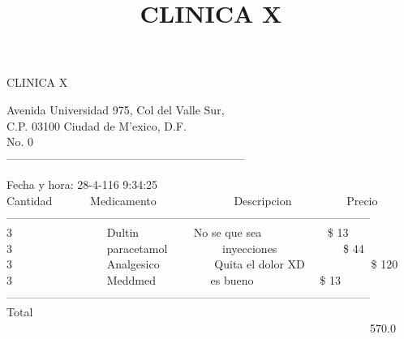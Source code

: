 \documentclass[10pt,a4paper]{letter}
\title{\bf CLINICA X}
\begin{document}
\begin{center}
{\scshape\LARGE CLINICA X\par}
{Avenida Universidad 975, Col del Valle Sur,\\}
{C.P. 03100 Ciudad de M'exico, D.F.}\\ 
{No. 0}\\ 
---------------------------------------------------------------
\end{center}

Fecha y hora: 28-4-116 9:34:25\\

Cantidad \ \ \ \ \ \ Medicamento \ \ \ \ \ \ \ \ \ \ \ \ \  Descripcion  \ \ \ \ \ \ \ \ \ Precio \\
------------------------------------------------------------------------------------------------ \\
3 \ \ \ \ \ \ \ \ \ \ \ \ \ \ \ \ Dultin \ \ \ \ \ \ \ \ \ No se que sea \ \ \ \ \ \ \ \ \ \ \ \$ 13 \\
3 \ \ \ \ \ \ \ \ \ \ \ \ \ \ \ \ paracetamol \ \ \ \ \ \ \ \ \ inyecciones \ \ \ \ \ \ \ \ \ \ \ \$ 44 \\
3 \ \ \ \ \ \ \ \ \ \ \ \ \ \ \ \ Analgesico \ \ \ \ \ \ \ \ \ Quita el dolor XD \ \ \ \ \ \ \ \ \ \ \ \$ 120 \\
3 \ \ \ \ \ \ \ \ \ \ \ \ \ \ \ \ Meddmed \ \ \ \ \ \ \ \ \ es bueno \ \ \ \ \ \ \ \ \ \ \ \$ 13 \\

------------------------------------------------------------------------------------------------ \\
Total	\ \ \ \ \ \ \ \ \ \ \ \ \  \ \ \ \ \ \ \ \ \ \ \ \ \ \ \ \ \ \ \ \ \ \ \ \ \ \ \ \ \ \ \ \ \ \ \ \ \ \ \ \ \  \ \ \ \ \ \ \ \ \ \ 570.0 \\
 
\end{document}
